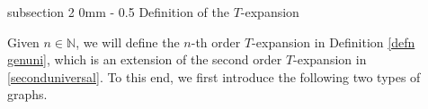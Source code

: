 \documentclass{article}
\makeatletter
\newcommand{\1}{\mathds{1}}
\numberwithin{equation}{section}
\renewcommand{\cal}{\mathcal}
\newcommand{\N}{\mathbb{N}}
\newcommand{\dashed}{\text{diffusive}}
\newcommand{\self}{\text{self-energy}}
\theoremstyle{plain} %
\theoremstyle{remark}
\newcommand{\cob}{\color{purple}}
\newcommand{\Sele}{{\mathcal E}}
\newcommand{\Seleinf}{{\mathcal E}^{\infty}}
\newcommand{\Sint}{\mathfrak S}
\newcommand{\Cele}{{\mathscr E}}
\renewcommand{\subsection}{\@startsection
{subsection}%
{2}%
{0mm}%
{-\baselineskip}%
{0.5\baselineskip}%
{\normalfont\bf\itshape}} %
\makeatother
\begin{document}
% 
%
 
\subsection{Definition of the $T$-expansion}\label{sec Texp2}
 
Given $n\in \N$, we will define the $n$-th order $T$-expansion in Definition \ref{defn genuni}, which is an extension of the second order $T$-expansion in \eqref{seconduniversal}. To this end, we first introduce the following two types of graphs. 
\end{document}
